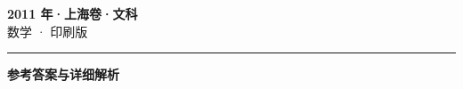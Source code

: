 \documentclass[zihao=5, a4paper]{ctexart}
\begin{document}
\begin{center}
  {\Large\bfseries 2011 年·上海卷·文科}\\[4pt]
  {\large 数学 · 印刷版}
\end{center}
\medskip
{}

\par\bigskip\hrule\bigskip
{}
\begin{center}{\large\bfseries 参考答案与详细解析}\end{center}
\smallskip

\end{document}

